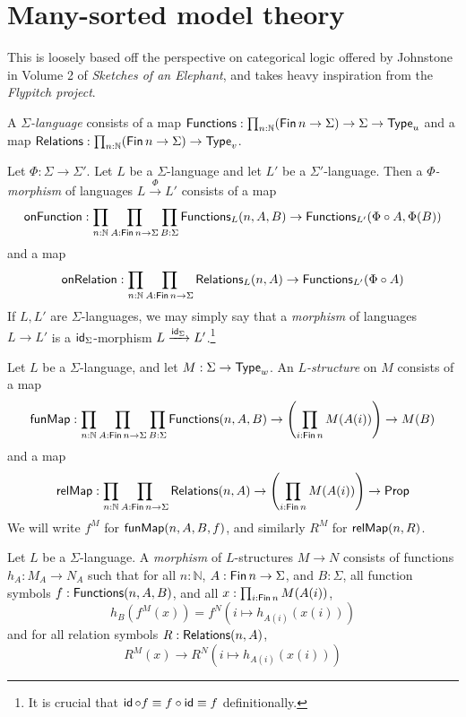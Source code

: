 \section{Many-sorted model theory}
This is loosely based off the perspective on categorical logic offered by Johnstone in Volume 2 of \emph{Sketches of an Elephant}, and takes heavy inspiration from the \emph{Flypitch project}.
\begin{definition}
  A \emph{\( \Sigma \)-language} consists of a map \( \operatorname{\mathsf{Functions}} : \prod_{n : \mathbb N} (\operatorname{\mathsf{Fin}} n \to \Sigma) \to \Sigma \to \mathsf{Type}_u \) and a map \( \operatorname{\mathsf{Relations}} : \prod_{n : \mathbb N} (\operatorname{\mathsf{Fin}} n \to \Sigma) \to \mathsf{Type}_v \).
\end{definition}
\begin{definition}
  Let \( \Phi : \Sigma \to \Sigma' \).
  Let \( L \) be a \( \Sigma \)-language and let \( L' \) be a \( \Sigma' \)-language.
  Then a \emph{\( \Phi \)-morphism} of languages \( L \xrightarrow\Phi L' \) consists of a map
  \[ \operatorname{\mathsf{onFunction}} : \prod_{n : \mathbb N} \prod_{A : \operatorname{\mathsf{Fin}} n \to \Sigma} \prod_{B : \Sigma} \operatorname{\mathsf{Functions}}_L(n, A, B) \to \operatorname{\mathsf{Functions}}_{L'}(\Phi \circ A, \Phi(B)) \]
  and a map
  \[ \operatorname{\mathsf{onRelation}} : \prod_{n : \mathbb N} \prod_{A : \operatorname{\mathsf{Fin}} n \to \Sigma} \operatorname{\mathsf{Relations}}_L(n, A) \to \operatorname{\mathsf{Functions}}_{L'}(\Phi \circ A) \]
  If \( L, L' \) are \( \Sigma \)-languages, we may simply say that a \emph{morphism} of languages \( L \to L' \) is a \( \operatorname{\mathsf{id}}_\Sigma \)-morphism \( L \xrightarrow{\operatorname{\mathsf{id}}_\Sigma} L' \).\footnote{It is crucial that \( \operatorname{\mathsf{id}} \circ f \equiv f \circ \operatorname{\mathsf{id}} \equiv f \) definitionally.}
\end{definition}
\begin{definition}
  Let \( L \) be a \( \Sigma \)-language, and let \( M : \Sigma \to \mathsf{Type}_w \).
  An \emph{\( L \)-structure} on \( M \) consists of a map
  \[ \operatorname{\mathsf{funMap}} : \prod_{n : \mathbb N} \prod_{A : \operatorname{\mathsf{Fin}} n \to \Sigma} \prod_{B : \Sigma} \operatorname{\mathsf{Functions}}(n, A, B) \to \left(\prod_{i : \operatorname{\mathsf{Fin}} n} M(A(i)) \right) \to M(B) \]
  and a map
  \[ \operatorname{\mathsf{relMap}} : \prod_{n : \mathbb N} \prod_{A : \operatorname{\mathsf{Fin}} n \to \Sigma} \operatorname{\mathsf{Relations}}(n, A) \to \left(\prod_{i : \operatorname{\mathsf{Fin}} n} M(A(i)) \right) \to \mathsf{Prop} \]
  We will write \( f^M \) for \( \operatorname{\mathsf{funMap}}(n, A, B, f) \), and similarly \( R^M \) for \( \operatorname{\mathsf{relMap}}(n, R) \).
\end{definition}
\begin{definition}
  Let \( L \) be a \( \Sigma \)-language.
  A \emph{morphism} of \( L \)-structures \( M \to N \) consists of functions \( h_A : M_A \to N_A \) such that for all \( n : \mathbb N \), \( A : \operatorname{\mathsf{Fin}} n \to \Sigma \), and \( B : \Sigma \), all function symbols \( f : \operatorname{\mathsf{Functions}}(n, A, B) \), and all \( x : \prod_{i : \operatorname{\mathsf{Fin}} n} M(A(i)) \),
  \[ h_B(f^M(x)) = f^N(i \mapsto h_{A(i)}(x(i))) \]
  and for all relation symbols \( R : \operatorname{\mathsf{Relations}}(n, A) \),
  \[ R^M(x) \to R^N(i \mapsto h_{A(i)}(x(i))) \]
\end{definition}
